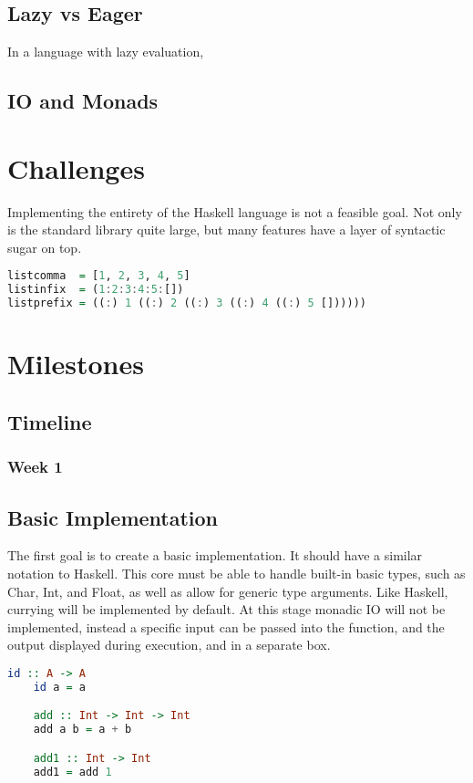 \documentclass[a4paper]{article}
\begin{document}
\subsection{Lazy vs Eager}
In a language with lazy evaluation, 
\subsection{IO and Monads}
\section{Challenges}
Implementing the entirety of the Haskell language is not a feasible goal. Not only is the standard library quite large, but many features have a layer of syntactic sugar on top.
\begin{lstlisting}[language=haskell, caption=3 ways to write a simple list.\cite{birminghamFP}]
listcomma  = [1, 2, 3, 4, 5]
listinfix  = (1:2:3:4:5:[])
listprefix = ((:) 1 ((:) 2 ((:) 3 ((:) 4 ((:) 5 [])))))
\end{lstlisting}

\section{Milestones}
\subsection{Timeline}
\subsubsection{Week 1}

\subsection{Basic Implementation}
The first goal is to create a basic implementation. It should have a similar notation to Haskell. This core must be able to handle built-in basic types, such as Char, Int, and Float, as well as allow for generic type arguments. Like Haskell, currying will be implemented by default. At this stage monadic IO will not be implemented, instead a specific input can be passed into the function, and the output displayed during execution, and in a separate box.
\begin{lstlisting}[language=haskell, caption=Example functions of stage 1.]
    id :: A -> A
    id a = a

    add :: Int -> Int -> Int
    add a b = a + b

    add1 :: Int -> Int
    add1 = add 1
\end{lstlisting}
\end{document}
